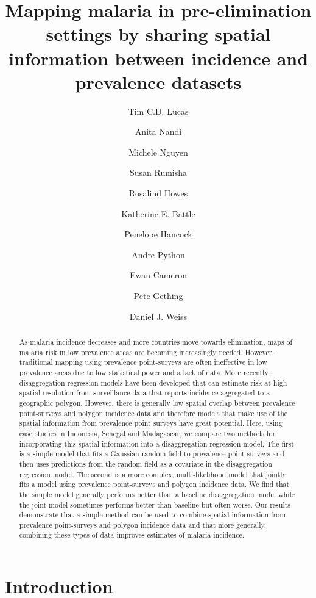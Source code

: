 \documentclass{statsoc}
\title[Mapping malaria by sharing spatial information]{Mapping malaria in pre-elimination settings by sharing spatial information between incidence and prevalence datasets}
\author[Tim C.D. Lucas {\it et al.}]{Tim C.D. Lucas}
\author{Anita Nandi}
\author{Michele Nguyen}
\author{Susan Rumisha}
\author{Rosalind Howes}
\author{Katherine E. Battle}
\author{Penelope Hancock}
\author{Andre Python}
\author{Ewan Cameron}
\author{Pete Gething}
\author{Daniel J. Weiss}
\begin{document}
\begin{abstract}
As malaria incidence decreases and more countries move towards elimination, maps of malaria risk in low prevalence areas are becoming increasingly needed.
However, traditional mapping using prevalence point-surveys are often ineffective in low prevalence areas due to low statistical power and a lack of data.
More recently, disaggregation regression models have been developed that can estimate risk at high spatial resolution from surveillance data that reports incidence aggregated to a geographic polygon.
However, there is generally low spatial overlap between prevalence point-surveys and polygon incidence data and therefore models that make use of the spatial information from prevalence point surveys have great potential.
Here, using case studies in Indonesia, Senegal and Madagascar, we compare two methods for incorporating this spatial information into a disaggregation regression model.
The first is a simple model that fits a Gaussian random field to prevalence point-surveys and then uses predictions from the random field as a covariate in the disaggregation regression model.
The second is a more complex, multi-likelihood model that jointly fits a model using prevalence point-surveys and  polygon incidence data.
We find that the simple model generally performs better than a baseline disaggregation model while the joint model sometimes performs better than baseline but often worse.
Our results demonstrate that a simple method can be used to combine spatial information from prevalence point-surveys and polygon incidence data and that more generally, combining these types of data improves estimates of malaria incidence.
\end{abstract}



\section*{Introduction}


\end{document}
